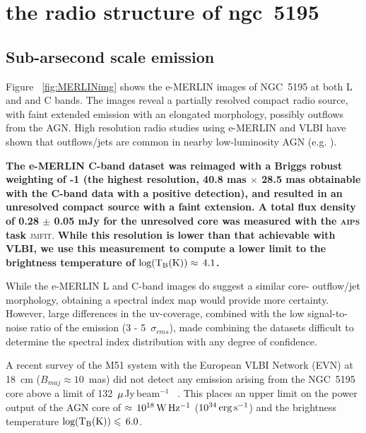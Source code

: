 \documentclass[fleqn,usenatbib]{mnras}
\def\Fig{Figure}
\def\mujybm   {${\rm \mu}$Jy\,beam$^{-1}$}
\begin{document}
\section{the radio structure of ngc~5195}

\subsection{Sub-arsecond scale emission}

\Fig~ \ref{fig:MERLINimg} shows the e-MERLIN images of NGC~5195 at both L and  and C bands. The 
images reveal a partially resolved compact radio source, with faint extended emission with an 
elongated morphology, possibly outflows from the AGN. High resolution radio studies using 
e-MERLIN and VLBI have shown that outflows/jets are common in nearby low-luminosity AGN (e.g. 
\citealt{Krips+2007,GP09}). 

\textbf{The e-MERLIN C-band dataset was reimaged with a Briggs robust weighting of -1 (the highest 
resolution, 40.8 mas $\times$ 28.5 mas obtainable with the C-band data with a positive 
detection), and resulted in an unresolved compact source with a faint extension. A total flux 
density of 0.28 $\pm$ 0.05 mJy for the unresolved core was measured with the \textsc{aips}} \textbf{task} \textsc{jmfit}. \textbf{While this resolution  is  lower than that 
achievable with VLBI, we use this measurement to compute a lower limit to the brightness temperature of ${\rm log(T_{B} (K))}\approx\,4.1$.}

While the e-MERLIN L and C-band images do suggest a similar core-
outflow/jet morphology, obtaining a spectral index map would provide more certainty. However, 
large differences in the uv-coverage, combined with the low signal-to-noise ratio of the 
emission (3 - 5~$\sigma_{rms}$), made combining the datasets difficult to determine the 
spectral index distribution with any degree of confidence. 

A recent survey of the M51 system with the European 
VLBI Network (EVN) at 18~cm ($B_{maj} \approx 10$~mas) did not detect any emission arising from 
the NGC~5195 core above a limit of 132~\mujybm~ \citep{Rampadarathetal15}. This places an upper 
limit on the power output of the AGN core of $\approx\,10^{18}\,{\rm W\,Hz^{-1}}$ 
($10^{34}\,{\rm erg\,s^{-1}}$) and the brightness temperature ${\rm log(T_{B} (K))}\leq\,6.0$. 
\end{document}
